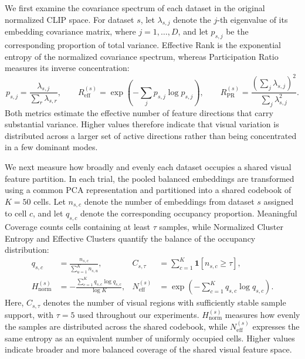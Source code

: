 We first examine the covariance spectrum of each dataset in the original normalized CLIP space. %
For dataset $s$, let $\lambda_{s,j}$ denote the $j$-th eigenvalue of its embedding covariance matrix, where $j=1,\ldots,D$, and let $p_{s,j}$ be the corresponding proportion of total variance. %
Effective Rank is the exponential entropy of the normalized covariance spectrum, whereas Participation Ratio measures its inverse concentration:
\begin{equation}
p_{s,j}=\frac{\lambda_{s,j}}{\sum_r\lambda_{s,r}},
\qquad
R_{\mathrm{eff}}^{(s)}
=\exp\!\left(-\sum_j p_{s,j}\log p_{s,j}\right),
\qquad
R_{\mathrm{PR}}^{(s)}
=\frac{\left(\sum_j\lambda_{s,j}\right)^2}
{\sum_j\lambda_{s,j}^{2}}.
\end{equation}
Both metrics estimate the effective number of feature directions that carry substantial variance. %
Higher values therefore indicate that visual variation is distributed across a larger set of active directions rather than being concentrated in a few dominant modes.

We next measure how broadly and evenly each dataset occupies a shared visual feature partition. %
In each trial, the pooled balanced embeddings are transformed using a common PCA representation and partitioned into a shared codebook of $K=50$ cells. %
Let $n_{s,c}$ denote the number of embeddings from dataset $s$ assigned to cell $c$, and let $q_{s,c}$ denote the corresponding occupancy proportion. %
Meaningful Coverage counts cells containing at least $\tau$ samples, while Normalized Cluster Entropy and Effective Clusters quantify the balance of the occupancy distribution:
\begin{equation}
\begin{aligned}
q_{s,c}
&=\frac{n_{s,c}}{\sum_{u=1}^{K}n_{s,u}},
&
C_{s,\tau}
&=\sum_{c=1}^{K}\mathbf{1}\!\left[n_{s,c}\ge\tau\right],
\\
H_{\mathrm{norm}}^{(s)}
&=-\frac{\sum_{c=1}^{K}q_{s,c}\log q_{s,c}}{\log K},
&
N_{\mathrm{eff}}^{(s)}
&=\exp\!\left(-\sum_{c=1}^{K}q_{s,c}\log q_{s,c}\right).
\end{aligned}
\end{equation}
Here, $C_{s,\tau}$ denotes the number of visual regions with sufficiently stable sample support, with $\tau=5$ used throughout our experiments. %
$H_{\mathrm{norm}}^{(s)}$ measures how evenly the samples are distributed across the shared codebook, while $N_{\mathrm{eff}}^{(s)}$ expresses the same entropy as an equivalent number of uniformly occupied cells. %
Higher values indicate broader and more balanced coverage of the shared visual feature space.

